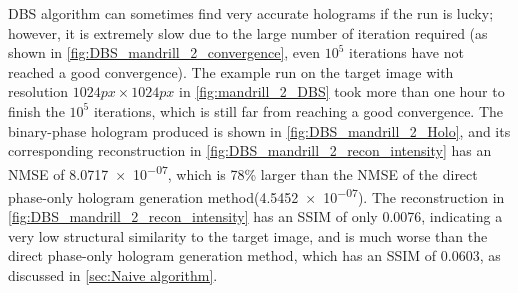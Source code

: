 DBS algorithm can sometimes find very accurate holograms if the run is lucky; however, it is extremely slow due to the large number of iteration required (as shown in \cref{fig:DBS_mandrill_2_convergence}, even $10^5$ iterations have not reached a good convergence). The example run on the target image with resolution $1024 px\times 1024 px$ in \cref{fig:mandrill_2_DBS} took more than one hour to finish the $10^5$ iterations, which is still far from reaching a good convergence. The binary-phase hologram produced is shown in \cref{fig:DBS_mandrill_2_Holo}, and its corresponding reconstruction in \cref{fig:DBS_mandrill_2_recon_intensity} has an NMSE of \num{8.0717e-07}, which is 78\% larger than the NMSE of the direct phase-only hologram generation method(\num{4.5452e-07}). The reconstruction in \cref{fig:DBS_mandrill_2_recon_intensity} has an SSIM of only 0.0076, indicating a very low structural similarity to the target image, and is much worse than the direct phase-only hologram generation method, which has an SSIM of 0.0603, as discussed in \cref{sec:Naive algorithm}.

